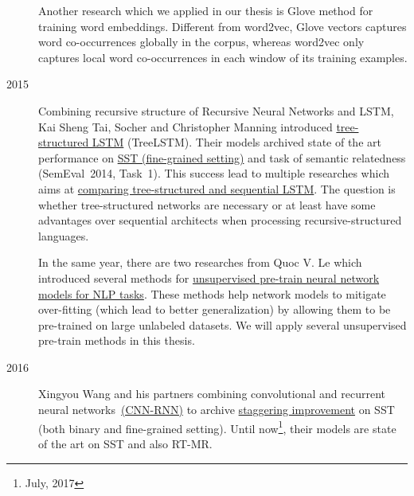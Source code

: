 \begin{description}
Another research which we applied in our thesis is Glove method for training word embeddings\cite{glove}.
Different from word2vec, Glove vectors captures word co-occurrences globally in the corpus, whereas word2vec only captures local word co-occurrences in each window of its training examples\cite{glove}.

\item [2015] Combining recursive structure of Recursive Neural Networks\cite{socher2013recursive} and LSTM\cite{originLSTM}, Kai Sheng Tai, Socher and Christopher Manning introduced \hyperref[sec:treelstm]{tree-structured LSTM}  (TreeLSTM)\cite{treeLSTM}.
Their models archived state of the art performance on \hyperref[sec:sst]{SST (fine-grained setting)} and task of semantic relatedness (SemEval~2014, Task~1\cite{SemeEvalTask1}).
This success lead to multiple researches\cite{need-tree}\cite{bowman-treevslstm}\cite{Graves_Nature2016} which aims at \hyperref[treelstm-advantage]{comparing tree-structured and sequential LSTM}. 
The question is whether tree-structured networks are necessary or at least have some advantages over sequential architects when processing recursive-structured languages\cite{need-tree}\cite{bowman-treevslstm}.   

In the same year, there are two researches\cite{ParagraphVec}\cite{semisup-seq2seq} from Quoc V. Le which introduced several methods for \hyperref[sec:unsupervised-pretrain]{unsupervised pre-train neural network models for NLP tasks}.
These methods help network models to mitigate over-fitting (which lead to better generalization) by allowing them to be pre-trained on large unlabeled datasets.
We will apply several unsupervised pre-train methods in this thesis.

\item [2016] Xingyou Wang and his partners combining convolutional and recurrent neural networks~\hyperref[cnn-rnn]{(CNN-RNN)} to archive \hyperref[table:cnn-rnn]{staggering improvement} on SST (both binary and fine-grained setting).
Until now\footnote{July, 2017}, their models are state of the art on SST and also RT-MR\cite{cnn-rnn}.
\end{description}  


